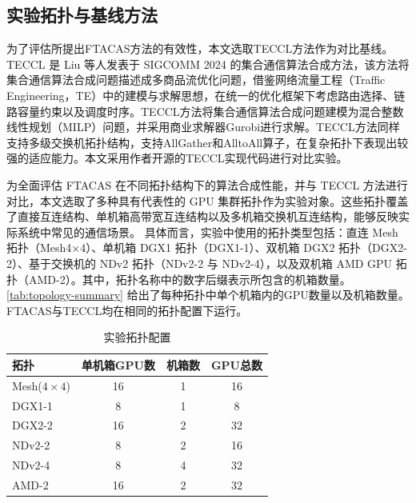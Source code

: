 \subsection{实验拓扑与基线方法}

为了评估所提出FTACAS方法的有效性，本文选取TECCL\cite{liu2024rethinking}方法作为对比基线。TECCL 是 Liu 等人发表于 SIGCOMM 2024 的集合通信算法合成方法，该方法将集合通信算法合成问题描述成多商品流优化问题，借鉴网络流量工程（Traffic Engineering，TE）中的建模与求解思想，在统一的优化框架下考虑路由选择、链路容量约束以及调度时序。TECCL方法将集合通信算法合成问题建模为混合整数线性规划（MILP）问题，并采用商业求解器Gurobi进行求解。TECCL方法同样支持多级交换机拓扑结构，支持AllGather和AlltoAll算子，在复杂拓扑下表现出较强的适应能力。本文采用作者开源的TECCL实现代码进行对比实验。

为全面评估 FTACAS 在不同拓扑结构下的算法合成性能，并与 TECCL 方法进行对比，本文选取了多种具有代表性的 GPU 集群拓扑作为实验对象。这些拓扑覆盖了直接互连结构、单机箱高带宽互连结构以及多机箱交换机互连结构，能够反映实际系统中常见的通信场景。
具体而言，实验中使用的拓扑类型包括：直连 Mesh 拓扑（Mesh4×4）、单机箱 DGX1 拓扑（DGX1-1）、双机箱 DGX2 拓扑（DGX2-2）、基于交换机的 NDv2 拓扑（NDv2-2 与 NDv2-4），以及双机箱 AMD GPU 拓扑（AMD-2）。其中，拓扑名称中的数字后缀表示所包含的机箱数量。
\autoref{tab:topology-summary} 给出了每种拓扑中单个机箱内的GPU数量以及机箱数量。FTACAS与TECCL均在相同的拓扑配置下运行。



\begin{table}[!htbp]
\centering
\caption{实验拓扑配置}
\label{tab:topology-summary}
\begin{tabular}{lccc}
\toprule
拓扑 & 单机箱GPU数 & 机箱数  & GPU总数\\
\midrule
Mesh($4\times4$)  & 16 & 1 & 16\\
DGX1-1            & 8  & 1 & 8\\
DGX2-2            & 16 & 2 & 32\\
NDv2-2            & 8  & 2 & 16\\
NDv2-4            & 8  & 4 & 32\\
AMD-2             & 16 & 2 & 32\\
\bottomrule
\end{tabular}
\end{table}




